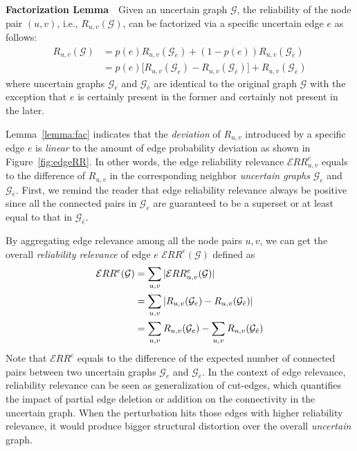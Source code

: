 \begin{lemma}
    \textbf{Factorization Lemma}~~Given an uncertain graph $\mathcal{G}$, the reliability of the node pair $(u,v)$, i.e., $R_{u,v}(\mathcal{G})$, can be factorized via a specific uncertain edge $e$ as follows:
    \begin{align*}
      R_{u,v}(\mathcal{G}) &= p(e) R_{u,v} (\mathcal{G}_{e}) + (1-p(e)) R_{u,v} (\mathcal{G}_{\bar{e}}) \\
                          & = p(e) \big[ R_{u,v} (\mathcal{G}_{e}) - R_{u,v} (\mathcal{G}_{\bar{e}}) \big] + R_{u,v} (\mathcal{G}_{\bar{e}})
    \end{align*}
    where uncertain graphs $\mathcal{G}_{e}$ and  $\mathcal{G}_{\bar{e}}$ are identical to the original graph $\mathcal{G}$ with the 
    exception that $e$ is certainly present in the former and certainly not present in the later.
    \label{lemma:fac} 
\end{lemma}

Lemma~\ref{lemma:fac} indicates that the \emph{deviation} of $R_{u,v}$ introduced by a specific edge $e$ is \emph{linear} to the amount of edge probability deviation as shown in Figure~\ref{fig:edgeRR}. In other words, the edge reliability relevance $\mathcal{E}RR^{e}_{u,v}$ equals to the difference of $R_{u,v}$ in the corresponding neighbor \emph{uncertain graphs} $\mathcal{G}_{e}$ and $\mathcal{G}_{\bar{e}}$. First, we remind the reader that edge reliability relevance always be positive since all the connected pairs in $\mathcal{G}_{e}$ are guaranteed to be a superset or at least equal to that in $\mathcal{G}_{\bar{e}}$.


By aggregating edge relevance among all the node pairs $u,v$, we can get the overall {\em reliability relevance} of edge $e$ $\mathcal{E}RR^{e}(\mathcal{G})$ defined as 
\begin{align*}
    \vspace{-1em}
    \mathcal{E}RR^e(\mathcal{G}) &= \sum_{u,v} |\mathcal{E}RR^e_{u,v}(\mathcal{G})| \\
                                 &= \sum_{u,v} |R_{u,v}(\mathcal{G}_{e}) -R_{u,v}(\mathcal{G}_{\bar{e}})| \\  
                                 &= \sum_{u,v} R_{u,v} (\mathcal{G}_{e}) - \sum_{u,v} R_{u,v}(\mathcal{G}_{\bar{e}}) 
\end{align*}
Note that $\mathcal{E}RR^e$ equals to the difference of the expected number of connected pairs between two uncertain graphs $\mathcal{G}_{e}$ and $\mathcal{G}_{\bar{e}}$.  
In the context of edge relevance, reliability relevance can be seen as generalization of cut-edges, which quantifies the impact of partial edge deletion or addition on the connectivity in the uncertain graph. 
When the perturbation hits those edges with higher reliability relevance, it would produce bigger structural distortion over the overall \emph{uncertain} graph. 


